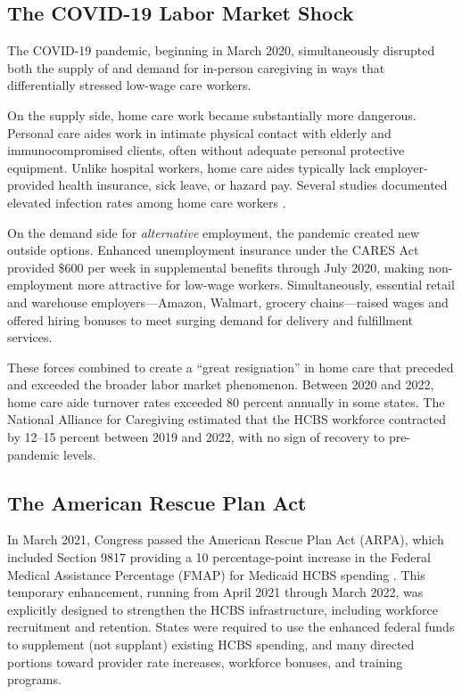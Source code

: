 \documentclass[12pt]{article}
\begin{document}
\subsection{The COVID-19 Labor Market Shock}

The COVID-19 pandemic, beginning in March 2020, simultaneously disrupted both the supply of and demand for in-person caregiving in ways that differentially stressed low-wage care workers.

On the supply side, home care work became substantially more dangerous. Personal care aides work in intimate physical contact with elderly and immunocompromised clients, often without adequate personal protective equipment. Unlike hospital workers, home care aides typically lack employer-provided health insurance, sick leave, or hazard pay. Several studies documented elevated infection rates among home care workers \citep{antonova2023essential}.

On the demand side for \textit{alternative} employment, the pandemic created new outside options. Enhanced unemployment insurance under the CARES Act provided \$600 per week in supplemental benefits through July 2020, making non-employment more attractive for low-wage workers. Simultaneously, essential retail and warehouse employers---Amazon, Walmart, grocery chains---raised wages and offered hiring bonuses to meet surging demand for delivery and fulfillment services.

These forces combined to create a ``great resignation'' in home care that preceded and exceeded the broader labor market phenomenon. Between 2020 and 2022, home care aide turnover rates exceeded 80 percent annually in some states. The National Alliance for Caregiving estimated that the HCBS workforce contracted by 12--15 percent between 2019 and 2022, with no sign of recovery to pre-pandemic levels.

\subsection{The American Rescue Plan Act}

In March 2021, Congress passed the American Rescue Plan Act (ARPA), which included Section 9817 providing a 10 percentage-point increase in the Federal Medical Assistance Percentage (FMAP) for Medicaid HCBS spending \citep{arpa2021}. This temporary enhancement, running from April 2021 through March 2022, was explicitly designed to strengthen the HCBS infrastructure, including workforce recruitment and retention. States were required to use the enhanced federal funds to supplement (not supplant) existing HCBS spending, and many directed portions toward provider rate increases, workforce bonuses, and training programs.
\end{document}

